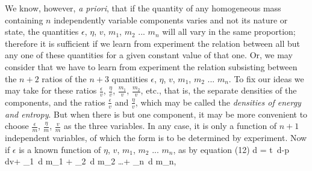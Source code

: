 \documentclass[12pt]{article}
\begin{document}
We know, however, \textit{a priori}, that if the quantity of any homogeneous mass containing $n$ independently variable components varies and not its nature or state, the quantities $\epsilon$, $\eta$, $v$, $m_1$, $m_2$ ... $m_n$ will all vary in the same proportion; therefore it is sufficient if we learn from experiment the relation between all but any one of these quantities for a given constant value of that one.  Or, we may consider that we have to learn from experiment the relation subsisting between the $n +2$ ratios of the $n+3$ quantities $\epsilon$, $\eta$, $v$, $m_1$, $m_2$ ... $m_n$.
To fix our ideas we may take for these ratios $\frac{\epsilon}{v}$, $\frac{\eta}{v}$, $\frac{m_1}{v}$, $\frac{m_2}{v}$, etc., that is, the separate densities of the components, and the ratios $\frac{\epsilon}{v}$ and $\frac{\eta}{v}$, which may be called the \textit{densities of energy and entropy}. But when there is but one component, it may be more convenient to choose $\frac{\epsilon}{m}$, $\frac{\eta}{m}$, $\frac{v}{m}$ as the three variables. In any case, it is only a function of $n+ 1$ independent variables, of which the form is to be determined by experiment.
Now if $\epsilon$ is a known function of $\eta$, $v$, $m_1$, $m_2$ ... $m_n$, as by equation (12)
\eqs d \epsilon = t \,d\eta-p \,dv+ \mu_1 \,d m_1 + \mu_2 \,d m_2 \dots + \mu_n \,d m_n,    \label{86}\eqe
\end{document}
